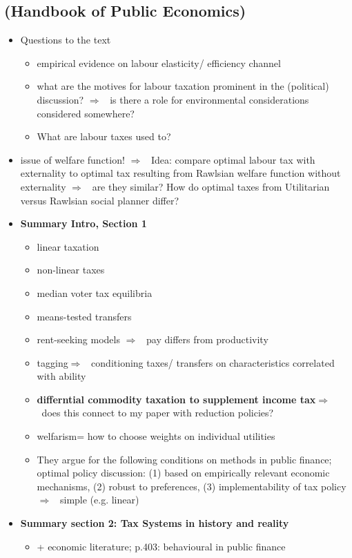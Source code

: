 \documentclass[12pt]{article}
\newcommand{\ar}{$\Rightarrow$ \ }
\begin{document}
\subsection{ \cite{Piketty2013OptimalTaxation} (Handbook of Public Economics)}
\begin{itemize}
\item  Questions to the text 
\begin{itemize}
	\item empirical evidence on labour elasticity/ efficiency channel
	\item what are the motives for labour taxation prominent in the (political) discussion? \ar is there a role for environmental considerations considered somewhere?
	\item What are labour taxes used to?
\end{itemize}
\item issue of welfare function! \ar Idea: compare optimal labour tax with externality to optimal tax resulting from Rawlsian welfare function without externality \ar are they similar?
How do optimal taxes from Utilitarian versus Rawlsian social planner differ?
\item \textbf{Summary Intro, Section 1}
\begin{itemize}
	\item linear taxation
	\item non-linear taxes
	\item median voter tax equilibria
	\item means-tested transfers
	\item rent-seeking models \ar pay differs from productivity
	\item tagging\ar conditioning taxes/ transfers on characteristics correlated with ability 
	\item \textbf{differntial commodity taxation to supplement income tax}\ar does this connect to my paper with reduction policies?
	\item welfarism= how to choose weights on individual utilities
	\item They argue for the following conditions on methods in public finance; optimal policy discussion: (1) based on empirically relevant economic mechanisms, (2) robust to preferences, (3) implementability of tax policy\ar simple (e.g. linear)
\end{itemize}
\item \textbf{Summary section 2: Tax Systems in history and reality}
\begin{itemize}
\item + economic literature; p.403: behavioural in public finance

\end{itemize}
\end{itemize}
\end{document}
